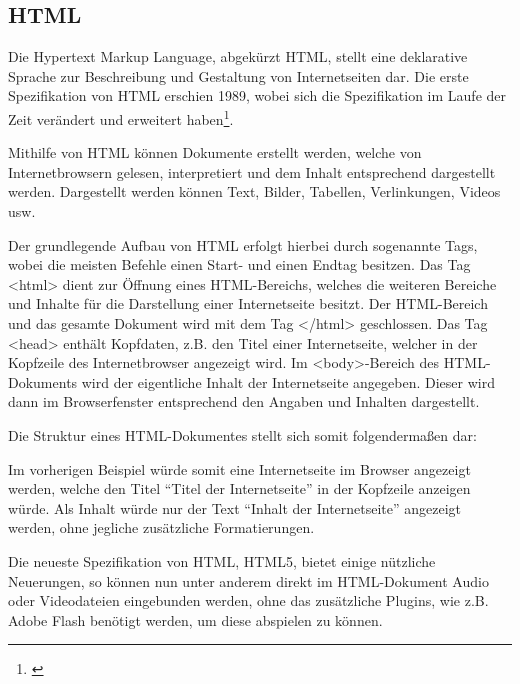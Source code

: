 \subsection{HTML}
\label{sec:Html}

Die Hypertext Markup Language, abgekürzt HTML, stellt eine deklarative Sprache zur Beschreibung und Gestaltung von Internetseiten dar. Die erste Spezifikation von HTML erschien 1989, wobei sich die Spezifikation im Laufe der Zeit verändert und erweitert haben\footnote{\citet[S.~27ff]{taglinger2003}}.

Mithilfe von HTML können Dokumente erstellt werden, welche von Internetbrowsern gelesen, interpretiert und dem Inhalt entsprechend dargestellt werden. Dargestellt werden können Text, Bilder, Tabellen, Verlinkungen, Videos usw.

Der grundlegende Aufbau von HTML erfolgt hierbei durch sogenannte Tags, wobei die meisten Befehle einen Start- und einen Endtag besitzen.
Das Tag <html> dient zur Öffnung eines HTML-Bereichs, welches die weiteren Bereiche und Inhalte für die Darstellung einer Internetseite besitzt. Der HTML-Bereich und das gesamte Dokument wird mit dem Tag </html> geschlossen. Das Tag <head> enthält Kopfdaten, z.B. den Titel einer Internetseite, welcher in der Kopfzeile des Internetbrowser angezeigt wird. Im <body>-Bereich des HTML-Dokuments wird der eigentliche Inhalt der Internetseite angegeben. Dieser wird dann im Browserfenster entsprechend den Angaben und Inhalten dargestellt.

Die Struktur eines HTML-Dokumentes stellt sich somit folgendermaßen dar:



Im vorherigen Beispiel würde somit eine Internetseite im Browser angezeigt werden, welche den Titel "`Titel der Internetseite"' in der Kopfzeile anzeigen würde. Als Inhalt würde nur der Text "`Inhalt der Internetseite"' angezeigt werden, ohne jegliche zusätzliche Formatierungen.

Die neueste Spezifikation von HTML, HTML5, bietet einige nützliche Neuerungen, so können nun unter anderem direkt im HTML-Dokument Audio oder Videodateien eingebunden werden, ohne das zusätzliche Plugins, wie z.B. Adobe Flash benötigt werden, um diese abspielen zu können.